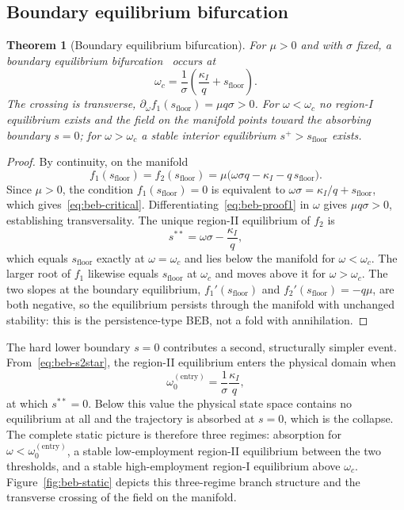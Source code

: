 \documentclass[review,12pt]{elsarticle}
\theoremstyle{plain}
\newtheorem{theorem}{Theorem}
\theoremstyle{definition}
\theoremstyle{remark}
\begin{document}
\subsection{Boundary equilibrium bifurcation}
\label{subsec:beb}
\begin{theorem}[Boundary equilibrium bifurcation]
\label{thm:beb}
For $\mu>0$ and with $\sigma$ fixed, a boundary equilibrium bifurcation~\citep{Sotomayor1973,Kuznetsov2023} occurs at
\begin{equation}
\boxed{\ \omega_c=\frac1\sigma\left(\frac{\kappa_I}{q}+s_{\text{floor}}\right).\ }
\label{eq:beb-critical}
\end{equation}
The crossing is transverse, $\partial_\omega f_1(s_{\text{floor}})=\mu q\sigma>0$. For $\omega<\omega_c$ no region-I equilibrium exists and the field on the manifold points toward the absorbing boundary $s=0$; for $\omega>\omega_c$ a stable interior equilibrium $s^+>s_{\text{floor}}$ exists.
\end{theorem}
\begin{proof}
By continuity, on the manifold
\begin{equation}
f_1(s_{\text{floor}})=f_2(s_{\text{floor}})
=\mu\bigl(\omega\sigma q-\kappa_I-q\,s_{\text{floor}}\bigr).
\label{eq:beb-proof1}
\end{equation}
Since $\mu>0$, the condition $f_1(s_{\text{floor}})=0$ is equivalent to
$\omega\sigma=\kappa_I/q+s_{\text{floor}}$, which gives~\eqref{eq:beb-critical}. Differentiating~\eqref{eq:beb-proof1} in $\omega$ gives $\mu q\sigma>0$, establishing transversality. The unique region-II equilibrium of $f_2$ is
\begin{equation}
s^{**}=\omega\sigma-\frac{\kappa_I}{q},
\label{eq:beb-s2star}
\end{equation}
which equals $s_{\text{floor}}$ exactly at $\omega=\omega_c$ and lies below the manifold for $\omega<\omega_c$. The larger root of $f_1$ likewise equals $s_{\text{floor}}$ at $\omega_c$ and moves above it for $\omega>\omega_c$. The two slopes at the boundary equilibrium, $f_1'(s_{\text{floor}})$ and $f_2'(s_{\text{floor}})=-q\mu$, are both negative, so the equilibrium persists through the manifold with unchanged stability: this is the persistence-type BEB, not a fold with annihilation.
\end{proof}

The hard lower boundary $s=0$ contributes a second, structurally simpler event. From~\eqref{eq:beb-s2star}, the region-II equilibrium enters the physical domain when
\begin{equation}
\omega_0^{(\text{entry})}=\frac1\sigma\frac{\kappa_I}{q},
\label{eq:beb-entry}
\end{equation}
at which $s^{**}=0$. Below this value the physical state space contains no equilibrium at all and the trajectory is absorbed at $s=0$, which is the collapse. The complete static picture is therefore three regimes: absorption for $\omega<\omega_0^{(\text{entry})}$, a stable low-employment region-II equilibrium between the two thresholds, and a stable high-employment region-I equilibrium above $\omega_c$. Figure~\ref{fig:beb-static} depicts this three-regime branch structure and the transverse crossing of the field on the manifold.
\end{document}

